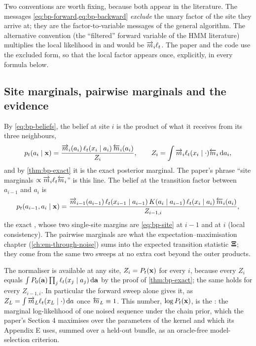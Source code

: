 Two conventions are worth fixing, because both appear in the literature. The messages
\cref{eq:bp-forward,eq:bp-backward} \emph{exclude} the unary factor of the site they
arrive at; they are the factor-to-variable messages of the general algorithm. The
alternative convention (the ``filtered'' forward variable of the HMM literature)
multiplies the local likelihood in and would be $\overrightarrow{m}_i\ell_t$. The paper and the code
use the excluded form, so that the local factor appears once, explicitly, in every
formula below.

\subsection{Site marginals, pairwise marginals and the evidence}

By \cref{eq:bp-beliefs}, the belief at site $i$ is the product of what it receives from
its three neighbours,
\begin{equation}
  p_t(a_i\mid\mathbf{x})=\frac{\overrightarrow{m}_i(a_i)\,\ell_t(x_i\mid a_i)\,\overleftarrow{m}_i(a_i)}{Z_i},\qquad
  Z_i=\int\overrightarrow{m}_i\ell_t(x_i\mid\cdot)\overleftarrow{m}_i\,\mathrm{d} a_i,
  \label{eq:bp-site}
\end{equation}
and by \cref{thm:bp-exact} it is the exact posterior marginal. The paper's phrase
``site marginals $\propto\overrightarrow{m}_i\ell_t\overleftarrow{m}_i$'' is this line. The belief at the
transition factor between $a_{i-1}$ and $a_i$ is
\begin{equation}
  p_t(a_{i-1},a_i\mid\mathbf{x})=\frac{\overrightarrow{m}_{i-1}(a_{i-1})\,\ell_t(x_{i-1}\mid a_{i-1})\,
    K(a_i\mid a_{i-1})\,\ell_t(x_i\mid a_i)\,\overleftarrow{m}_i(a_i)}{Z_{i-1,i}},
  \label{eq:bp-pair}
\end{equation}
the exact , whose two single-site margins are \cref{eq:bp-site}
at $i-1$ and at $i$ (local consistency). The pairwise marginals are what the
expectation--maximisation chapter (\cref{ch:em-through-noise}) sums into the expected
transition statistic $\mathbf{\Xi}$; they come from the same two sweeps at no extra cost beyond
the outer products.

The normaliser is available at any site, $Z_i=P_t(\mathbf{x})$ for every $i$, because every
$Z_i$ equals $\int P_0(\mathbf{a})\prod_j\ell_t(x_j\mid a_j)\,\mathrm{d}\mathbf{a}$ by the proof of
\cref{thm:bp-exact}; the same holds for every $Z_{i-1,i}$. In particular the forward
sweep alone gives it, as $Z_L=\int\overrightarrow{m}_L\ell_t(x_L\mid\cdot)\,\mathrm{d} a$ once
$\overleftarrow{m}_L\equiv1$. This number, $\log P_t(\mathbf{x})$, is the : the
marginal log-likelihood of one noised sequence under the chain prior, which the paper's
Section 4 maximises over the parameters of the kernel and which its Appendix E uses,
summed over a held-out bundle, as an oracle-free model-selection criterion.

